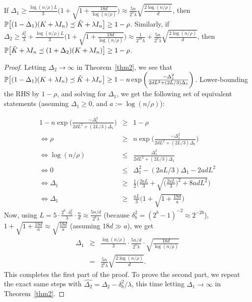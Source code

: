 \documentclass[12pt]{article}
\newcommand{\tK}{\tilde{K}}
\newcommand{\defeq}{:=}
\begin{document}
\begin{corollary}
	If $\Delta_1 \geq \frac{\log(n/\rho)L}{3}\Big(1+\sqrt{1+\frac{18d}{\log(n/\rho)}}\Big) \approx \frac{5n}{2^b \lambda}\sqrt{\frac{2\log(n/\rho)}{d}}$,
	then $\Prob\big[(1 - \Delta_1) (K + \lambda I_n) \preceq \tK + \lambda I_n \big] \geq  1 - \rho$. 
	Similarly, if $\Delta_2 \geq \frac{\delta_b^2}{\lambda} +  \frac{\log(n/\rho)L}{3}\Big(1+\sqrt{1+\frac{18d}{\log(n/\rho)}}\Big) \approx \frac{1}{2^{2b}\lambda} + \frac{5n}{2^b \lambda}\sqrt{\frac{2\log(n/\rho)}{d}}$,
	then $\Prob\big[\tK + \lambda I_n \preceq (1 + \Delta_2) (K + \lambda I_n)\big] \geq  1 - \rho$. 
\end{corollary}

\begin{proof}
Letting $\Delta_2 \rightarrow \infty$ in Theorem~\ref{thm2}, we see that 
$\Prob\big[(1 - \Delta_1) (K + \lambda I_n) \preceq \tK + \lambda I_n \big] \geq 1 - n \exp \bigg(\frac{-\Delta_1^2}{2dL^2 + (2L/3)\Delta_1}\bigg)$.
Lower-bounding the RHS by $1-\rho$, and solving for $\Delta_1$, we get the following set of equivalent statements (assuming $\Delta_1 \geq 0$, and $a\defeq \log(n/\rho)$):

\begin{eqnarray*}
1 - n \exp \bigg(\frac{-\Delta_1^2}{2dL^2 + (2L/3)\Delta_1}\bigg) &\geq& 1-\rho \\
\Longleftrightarrow \rho &\geq& n \exp \bigg(\frac{-\Delta_1^2}{2dL^2 + (2L/3)\Delta_1}\bigg) \\
\Longleftrightarrow \log(n/\rho) &\leq& \frac{\Delta_1^2}{2dL^2 + (2L/3)\Delta_1} \\
\Longleftrightarrow 0 &\leq&  \Delta_1^2 - (2aL/3)\Delta_1 - 2adL^2 \\
\Longleftrightarrow \Delta_1 &\geq&  \frac{1}{2}\bigg(\frac{2aL}{3} + \sqrt{\Big(\frac{2aL}{3}\Big)^2 + 8adL^2}\bigg) \\
\Longleftrightarrow \Delta_1 &\geq& \frac{aL}{3}\bigg(1 + \sqrt{1 + \frac{18d}{a}}\bigg)
\end{eqnarray*}
Now, using $L = 5 \cdot \frac{2^b \cdot \delta_b^2}{\lambda}\cdot  \frac{n}{d} \approx \frac{5n/d}{2^b \lambda}$ (because $\delta_b^2 = (2^b-1)^{-2} \approx 2^{-2b}$), $1 + \sqrt{1 + \frac{18d}{a}} \approx \sqrt{\frac{18d}{a}}$ (assuming $18d \gg a$), we get
\begin{eqnarray*}
	\Delta_1 &\gtrsim& \frac{\log(n/\rho)}{3}\cdot \frac{5n/d}{2^b \lambda}\cdot \sqrt{\frac{18d}{\log(n/\rho)}} \\
	&=& \frac{5n}{2^b \lambda}\sqrt{\frac{2\log(n/\rho)}{d}}.
\end{eqnarray*}
This completes the first part of the proof.
To prove the second part, we repeat the exact same steps with $\widehat{\Delta_2} = \Delta_2 - \delta_b^2/\lambda$, this time letting $\Delta_1 \rightarrow \infty$ in Theorem~\ref{thm2}.

\end{proof}
\end{document}
